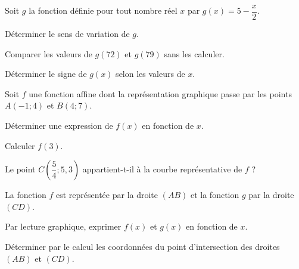 \documentclass[12pt,a4paper]{book}
\begin{document}
\exerciceDS{}

Soit $g$ la fonction définie pour tout nombre réel $x$ par $g(x)=5-\dfrac{x}{2}$.
\begin{enumMet}
	\item Déterminer le sens de variation de $g$. 
	\item Comparer les valeurs de $g(72)$ et $g(79)$ sans les calculer.
	\item Déterminer le signe de $g(x)$ selon les valeurs de $x$.
\end{enumMet}

\exerciceDS{}

Soit $f$ une fonction affine dont la représentation graphique passe par les points $A(-1 ; 4)$ et $B(4 ; 7)$.
\begin{enumMet}
	\item Déterminer une expression de $f(x)$ en fonction de $x$.
	\item Calculer $f(3)$. 

%
%

	\item Le point $C\left(\dfrac{5}{4} ; 5,3\right)$ appartient-t-il à la courbe représentative de $f$ ?
\end{enumMet}


\exerciceDS{}
La fonction $f$ est représentée par la droite $(AB)$ et la fonction $g$ par la droite $(CD)$.
\begin{enumMet}
	\item Par lecture graphique, exprimer $f(x)$ et $g(x)$ en fonction de $x$.
	\item Déterminer par le calcul les coordonnées du point d'intersection des droites $(AB)$ et $(CD)$.
\end{enumMet}
\end{document}
